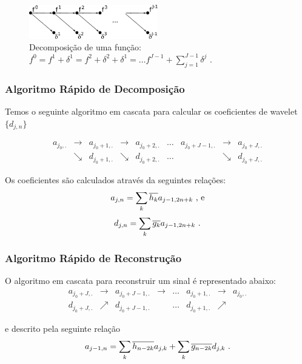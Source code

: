 \begin{frame}[allowframebreaks]
    \framebreak

    \begin{figure}[htp]
    \centering
    \includegraphics[width=0.5\textwidth]{images/fun_f0_d2.pdf}
    \caption{Decomposição de uma função: $f^0 = f^1 + \delta^1 = f^2 + \delta^2 + \delta^1 = \ldots f^{J-1} + \sum_{j=1}^{J-1} \delta^j$ \citep{araujo2007}.}
    \label{fig-funf4}
    \end{figure}

\end{frame}

\begin{frame}%
  \frametitle{Algoritmo Rápido de Decomposição}
  Temos o seguinte algoritmo em cascata para calcular os coeficientes de wavelet
  $\{d_{j,n}\}$
  
  \begin{equation}
     \begin{matrix}
        a_{j_0,.} & \rightarrow & a_{j_0+1,.} & \rightarrow & a_{j_0+2,.} & \ldots & a_{j_0+J-1,.} & \rightarrow  & a_{j_0+J,.} \\
                  & \searrow & d_{j_0+1,.} & \searrow & d_{j_0+2,.} & \ldots & & \searrow & d_{j_0+J,.}
     \end{matrix}
  \end{equation}

  Os coeficientes são calculados através da seguintes relações:
  \begin{equation}
        a_{j,n} = \sum_k \overline{h_k} a_{j-1,2n+k} \textmd{ , e}
  \end{equation}
  \begin{equation}
        d_{j,n} = \sum_k \overline{g_k} a_{j-1,2n+k} \textmd{ .}
  \end{equation}
\end{frame}

\begin{frame}%
  \frametitle{Algoritmo Rápido de Reconstrução}

  O algoritmo em cascata para reconstruir um sinal é representado abaixo:
  \begin{equation}
     \begin{matrix}
        a_{j_0+J,.} & \rightarrow & a_{j_0+J-1,.} & \rightarrow & \ldots & a_{j_0+1,.} & \rightarrow  & a_{j_0,.} \\
        d_{j_0+J,.} & \nearrow & d_{j_0+J-1,.} &   &   \ldots & d_{j_0+1,.} & \nearrow & 
     \end{matrix}
  \end{equation}

  e descrito pela seguinte relação
  \begin{equation}
        a_{j-1,n} = \sum_k \overline{h_{n-2k}} a_{j,k}  + \sum_k \overline{g_{n-2k}} d_{j,k} \textmd{ .}
  \end{equation}
\end{frame}

